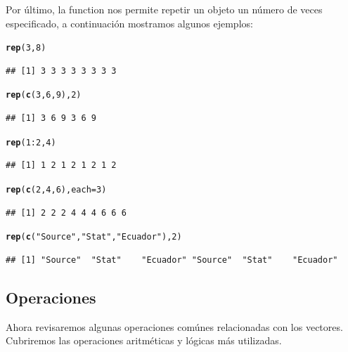 \documentclass[11pt,a4paper,oneside]{book}\usepackage[]{graphicx}\usepackage[]{color}
\makeatletter
\newcommand{\hlnum}[1]{\textcolor[rgb]{0.686,0.059,0.569}{#1}}%
\newcommand{\hlstr}[1]{\textcolor[rgb]{0.192,0.494,0.8}{#1}}%
\newcommand{\hlopt}[1]{\textcolor[rgb]{0,0,0}{#1}}%
\newcommand{\hlstd}[1]{\textcolor[rgb]{0.345,0.345,0.345}{#1}}%
\newcommand{\hlkwc}[1]{\textcolor[rgb]{0.333,0.667,0.333}{#1}}%
\newcommand{\hlkwd}[1]{\textcolor[rgb]{0.737,0.353,0.396}{\textbf{#1}}}%
\newenvironment{kframe}{%
 \def\at@end@of@kframe{}%
 \ifinner\ifhmode%
  \def\at@end@of@kframe{\end{minipage}}%
  \begin{minipage}{\columnwidth}%
 \fi\fi%
 \def\FrameCommand##1{\hskip\@totalleftmargin \hskip-\fboxsep
 \colorbox{shadecolor}{##1}\hskip-\fboxsep
     \hskip-\linewidth \hskip-\@totalleftmargin \hskip\columnwidth}%
 \MakeFramed {\advance\hsize-\width
   \@totalleftmargin\z@ \linewidth\hsize
   \@setminipage}}%
 {\par\unskip\endMakeFramed%
 \at@end@of@kframe}
\newenvironment{knitrout}{}{} %
\newcommand{\code}[1]{\fcolorbox{white}{gray!15}{#1}}
\makeatother
\begin{document}
\begin{itemize}
Por último, la function \code{\texttt{rep( )}} nos permite repetir un objeto un número de veces especificado, a continuación mostramos algunos ejemplos:
\begin{knitrout}
\color{fgcolor}\begin{kframe}
\begin{alltt}
\hlkwd{rep}\hlstd{(}\hlnum{3}\hlstd{,} \hlnum{8}\hlstd{)}
\end{alltt}
\begin{verbatim}
## [1] 3 3 3 3 3 3 3 3
\end{verbatim}
\begin{alltt}
\hlkwd{rep}\hlstd{(}\hlkwd{c}\hlstd{(}\hlnum{3}\hlstd{,} \hlnum{6}\hlstd{,} \hlnum{9}\hlstd{),} \hlnum{2}\hlstd{)}
\end{alltt}
\begin{verbatim}
## [1] 3 6 9 3 6 9
\end{verbatim}
\begin{alltt}
\hlkwd{rep}\hlstd{(}\hlnum{1}\hlopt{:}\hlnum{2}\hlstd{,} \hlnum{4}\hlstd{)}
\end{alltt}
\begin{verbatim}
## [1] 1 2 1 2 1 2 1 2
\end{verbatim}
\begin{alltt}
\hlkwd{rep}\hlstd{(}\hlkwd{c}\hlstd{(}\hlnum{2}\hlstd{,} \hlnum{4}\hlstd{,} \hlnum{6}\hlstd{),} \hlkwc{each} \hlstd{=} \hlnum{3}\hlstd{)}
\end{alltt}
\begin{verbatim}
## [1] 2 2 2 4 4 4 6 6 6
\end{verbatim}
\begin{alltt}
\hlkwd{rep}\hlstd{(}\hlkwd{c}\hlstd{(}\hlstr{"Source"}\hlstd{,} \hlstr{"Stat"}\hlstd{,} \hlstr{"Ecuador"}\hlstd{),} \hlnum{2}\hlstd{)}
\end{alltt}
\begin{verbatim}
## [1] "Source"  "Stat"    "Ecuador" "Source"  "Stat"    "Ecuador"
\end{verbatim}
\end{kframe}
\end{knitrout}

\subsection{Operaciones}

Ahora revisaremos algunas operaciones comúnes relacionadas con los vectores. Cubriremos las operaciones aritméticas y lógicas más utilizadas.


\end{itemize}
\end{document}
